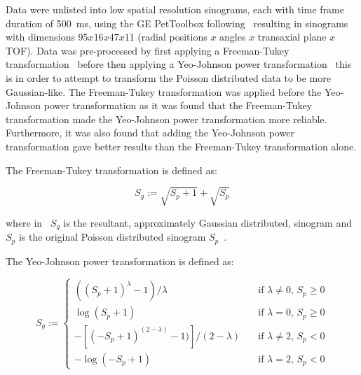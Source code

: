                 Data were unlisted into low spatial resolution sinograms, each with time frame duration of \SI{500}{\milli\second}, using the \gls{GE} PetToolbox following~ resulting in sinograms with dimensions $95 x 16 x 47 x 11$ (radial positions $x$ angles $x$ transaxial plane $x$ \gls{TOF}). Data was pre-processed by first applying a Freeman-Tukey transformation~ before then applying a Yeo-Johnson power transformation~ this is in order to attempt to transform the Poisson distributed data to be more Gaussian-like. The Freeman-Tukey transformation was applied before the Yeo-Johnson power transformation as it was found that the Freeman-Tukey transformation made the Yeo-Johnson power transformation more reliable. Furthermore, it was also found that adding the Yeo-Johnson power transformation gave better results than the Freeman-Tukey transformation alone.
                
                The Freeman-Tukey transformation is defined as:

                \begin{equation} \label{eq:pca_data_driven_surrogate_signal_extraction_methods_for_dynamic_pet_methods_freeman_tukey}
                    S_g := \sqrt{S_p + 1} + \sqrt{S_p}
                \end{equation}

                \noindent where in~ $S_g$ is the resultant, approximately Gaussian distributed, sinogram and $S_p$ is the original Poisson distributed sinogram $S_p$~.
                
                The Yeo-Johnson power transformation is defined as:

                \begin{equation} \label{eq:pca_data_driven_surrogate_signal_extraction_methods_for_dynamic_pet_methods_yeo_johnson}
                    S_g := \begin{cases}
                                ((S_p + 1)^\lambda - 1) / \lambda                   & \quad \text{if } \lambda \neq 0 \text{, } S_p \geq 0 \\
                                \log(S_p + 1)                                       & \quad \text{if } \lambda = 0 \text{, } S_p \geq 0    \\
                                -[(-S_p + 1)^{(2 - \lambda)} - 1)] / (2 - \lambda)  & \quad \text{if } \lambda \neq 2 \text{, } S_p < 0    \\
                                -\log(-S_p + 1)                                     & \quad \text{if } \lambda = 2 \text{, } S_p < 0
                            \end{cases}
                \end{equation}

